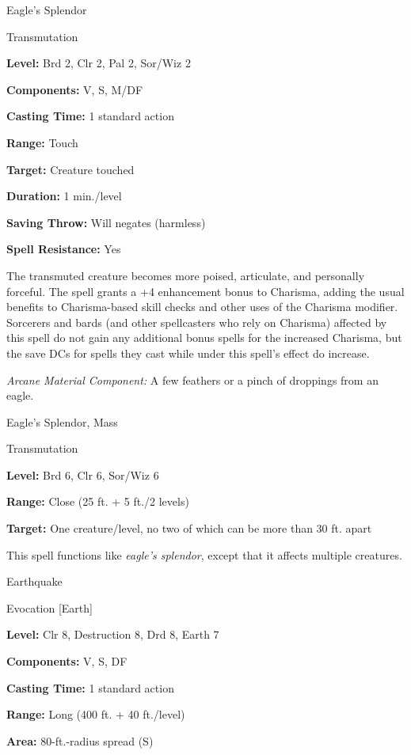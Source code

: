 \documentclass{article}
\begin{document}
\vspace{12pt}
Eagle's Splendor

Transmutation

\textbf{Level:} Brd 2, Clr 2, Pal 2, Sor/Wiz 2

\textbf{Components:} V, S, M/DF

\textbf{Casting Time:} 1 standard action

\textbf{Range:} Touch

\textbf{Target:} Creature touched

\textbf{Duration:} 1 min./level

\textbf{Saving Throw: }Will negates (harmless)

\textbf{Spell Resistance:} Yes

The transmuted creature becomes more poised, articulate, and personally forceful. 
The spell grants a +4 enhancement bonus to Charisma, adding the usual benefits 
to Charisma-based skill checks and other uses of the Charisma modifier. Sorcerers 
and bards (and other spellcasters who rely on Charisma) affected by this spell 
do not gain any additional bonus spells for the increased Charisma, but the save 
DCs for spells they cast while under this spell's effect do increase.

\textit{Arcane Material Component: }A few feathers or a pinch of droppings from 
an eagle.

\vspace{12pt}
Eagle's Splendor, Mass

Transmutation

\textbf{Level:} Brd 6, Clr 6, Sor/Wiz 6

\textbf{Range:} Close (25 ft. + 5 ft./2 levels)

\textbf{Target:} One creature/level, no two of which can be more than 30 ft. apart

This spell functions like \textit{eagle's splendor}, except that it affects multiple 
creatures.

\vspace{12pt}
Earthquake

Evocation [Earth]

\textbf{Level:} Clr 8, Destruction 8, Drd 8, Earth 7

\textbf{Components:} V, S, DF

\textbf{Casting Time:} 1 standard action

\textbf{Range:} Long (400 ft. + 40 ft./level)

\textbf{Area:} 80-ft.-radius spread (S)
\end{document}
